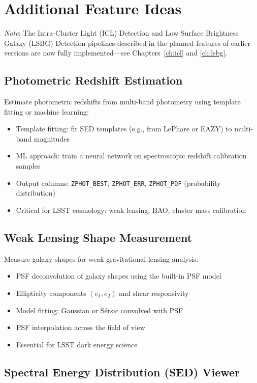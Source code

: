 \documentclass[11pt,fleqn]{book}
\begin{document}
\section{Additional Feature Ideas}

\textit{Note}: The Intra-Cluster Light (ICL) Detection and Low Surface Brightness Galaxy (LSBG) Detection pipelines described in the planned features of earlier versions are now fully implemented---see Chapters~\ref{ch:icl} and \ref{ch:lsbg}.
\bigskip

\subsection{Photometric Redshift Estimation}

Estimate photometric redshifts from multi-band photometry using template fitting or machine learning:
\begin{itemize}[leftmargin=2em]
  \item Template fitting: fit SED templates (e.g., from LePhare or EAZY) to multi-band magnitudes
  \item ML approach: train a neural network on spectroscopic redshift calibration samples
  \item Output columns: \texttt{ZPHOT\_BEST}, \texttt{ZPHOT\_ERR}, \texttt{ZPHOT\_PDF} (probability distribution)
  \item Critical for LSST cosmology: weak lensing, BAO, cluster mass calibration
\end{itemize}

\subsection{Weak Lensing Shape Measurement}

Measure galaxy shapes for weak gravitational lensing analysis:
\begin{itemize}[leftmargin=2em]
  \item PSF deconvolution of galaxy shapes using the built-in PSF model
  \item Ellipticity components $(e_1, e_2)$ and shear responsivity
  \item Model fitting: Gaussian or S\'ersic convolved with PSF
  \item PSF interpolation across the field of view
  \item Essential for LSST dark energy science
\end{itemize}

\subsection{Spectral Energy Distribution (SED) Viewer}
\end{document}
